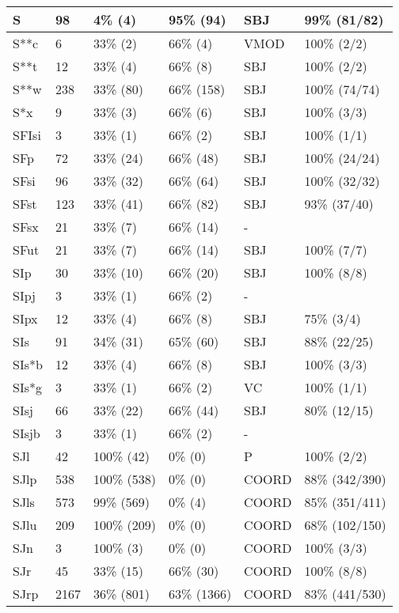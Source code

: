 \begin{figure*}
\begin{tabular}{|l|l|l|l||l|l|}
\hline
 S & 98 & 4\% (4) & 95\% (94) & SBJ & 99\% (81/82) \\ 
\hline
 S**c & 6 & 33\% (2) & 66\% (4) & VMOD & 100\% (2/2) \\ 
\hline
 S**t & 12 & 33\% (4) & 66\% (8) & SBJ & 100\% (2/2) \\ 
\hline
 S**w & 238 & 33\% (80) & 66\% (158) & SBJ & 100\% (74/74) \\ 
\hline
 S*x & 9 & 33\% (3) & 66\% (6) & SBJ & 100\% (3/3) \\ 
\hline
 SFIsi & 3 & 33\% (1) & 66\% (2) & SBJ & 100\% (1/1) \\ 
\hline
 SFp & 72 & 33\% (24) & 66\% (48) & SBJ & 100\% (24/24) \\ 
\hline
 SFsi & 96 & 33\% (32) & 66\% (64) & SBJ & 100\% (32/32) \\ 
\hline
 SFst & 123 & 33\% (41) & 66\% (82) & SBJ & 93\% (37/40) \\ 
\hline
 SFsx & 21 & 33\% (7) & 66\% (14) & - &  \\ 
\hline
 SFut & 21 & 33\% (7) & 66\% (14) & SBJ & 100\% (7/7) \\ 
\hline
 SIp & 30 & 33\% (10) & 66\% (20) & SBJ & 100\% (8/8) \\ 
\hline
 SIpj & 3 & 33\% (1) & 66\% (2) & - &  \\ 
\hline
 SIpx & 12 & 33\% (4) & 66\% (8) & SBJ & 75\% (3/4) \\ 
\hline
 SIs & 91 & 34\% (31) & 65\% (60) & SBJ & 88\% (22/25) \\ 
\hline
 SIs*b & 12 & 33\% (4) & 66\% (8) & SBJ & 100\% (3/3) \\ 
\hline
 SIs*g & 3 & 33\% (1) & 66\% (2) & VC & 100\% (1/1) \\ 
\hline
 SIsj & 66 & 33\% (22) & 66\% (44) & SBJ & 80\% (12/15) \\ 
\hline
 SIsjb & 3 & 33\% (1) & 66\% (2) & - &  \\ 
\hline
 SJl & 42 & 100\% (42) & 0\% (0) & P & 100\% (2/2) \\ 
\hline
 SJlp & 538 & 100\% (538) & 0\% (0) & COORD & 88\% (342/390) \\ 
\hline
 SJls & 573 & 99\% (569) & 0\% (4) & COORD & 85\% (351/411) \\ 
\hline
 SJlu & 209 & 100\% (209) & 0\% (0) & COORD & 68\% (102/150) \\ 
\hline
 SJn & 3 & 100\% (3) & 0\% (0) & COORD & 100\% (3/3) \\ 
\hline
 SJr & 45 & 33\% (15) & 66\% (30) & COORD & 100\% (8/8) \\ 
\hline
 SJrp & 2167 & 36\% (801) & 63\% (1366) & COORD & 83\% (441/530) \\ 
\hline
\end{tabular}
\end{figure*}
